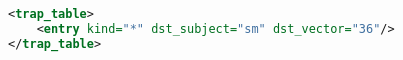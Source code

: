 \begin{lstlisting}[language=xml, label=lst:trap-table, caption=Subject trap table]
<trap_table>
    <entry kind="*" dst_subject="sm" dst_vector="36"/>
</trap_table>
\end{lstlisting}
